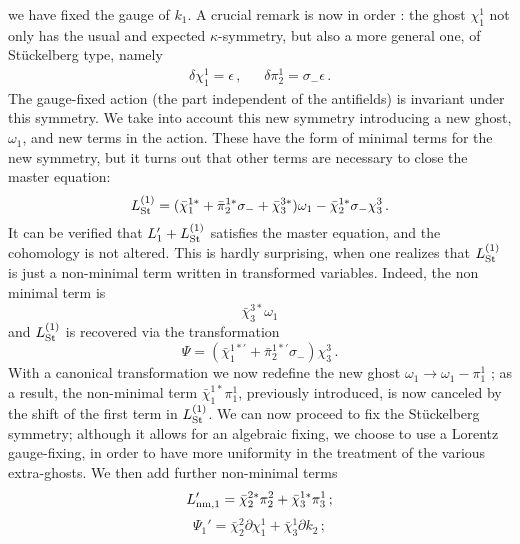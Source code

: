 \documentclass[a4paper,12pt]{article}
\begin{document}
we have fixed the gauge of $k_1$. 
A crucial remark is now in order \cite{kallosh}: the ghost
$\chi_1^1$ 
not only has the usual and expected $\kappa$-symmetry, but also a more
general one, of St\"uckelberg type, namely
\begin{eqnarray*}
  \delta \chi_1^1 =  \epsilon \, ,~~~~~~~
  \delta \pi_2^1 =  \sigma_- \epsilon \, . 
\end{eqnarray*}
The gauge-fixed action (the part independent of the antifields) is
invariant under this symmetry. We take into account this new symmetry
introducing a new ghost, $\omega_1$, and new terms in the
action. These have the form of minimal terms for the new symmetry, but 
it turns out that other terms are necessary to close the master
equation:
\begin{equation}
  L_{\rm St}^{(1)} = ({\bar\chi}_1^{1*}  + {\bar \pi}_2^{1*} \sigma_- 
  + {\bar\chi}_3^{3*}) \omega_1 - {\bar\chi}_2^{1*} \sigma_-
  \chi_3^3 \, .
\end{equation}
It can be verified that $L_1' + L_{\rm St}^{(1)}$ satisfies the master
equation, and the cohomology is not altered.
This is hardly surprising, when one realizes that $L_{\rm St}^{(1)}$ is
just a non-minimal term written in transformed variables. Indeed, the
non minimal term is
\begin{displaymath}
  {\bar\chi}_3^{3*} \omega_1
\end{displaymath}
and $L_{\rm St}^{(1)}$ is recovered via the transformation
\begin{displaymath}
  \Psi = ({\bar\chi}_1^{{1*}'} + {\bar\pi}_2^{{1*}'} \sigma_-) \chi_3^3 \, .
\end{displaymath}
With a canonical transformation we now redefine the new ghost
$\omega_1 \to \omega_1 - \pi_1^1$ ; as a result, the non-minimal term
${\bar\chi}_1^{1*} \pi_1^1$, previously introduced, is now canceled by the
shift of the first term in $ L_{\rm St}^{(1)}$. We can now proceed to fix 
the St\"uckelberg symmetry; although it allows for an algebraic
fixing, we choose to use a Lorentz gauge-fixing, in order to have more 
uniformity in the treatment of the various extra-ghosts.  We then add
further non-minimal terms
\begin{equation}
  L_{\rm nm,1}' = {\bar\chi}_2^{2*} \pi_2^2 + {\bar\chi}_3^{1*} \pi_3^1 \, 
  ;
\end{equation}
\begin{displaymath}
  \Psi_1' = \bar\chi_2^2 \partial \chi_1^1 + \bar\chi_3^1 \partial k_2 
  \, ;
\end{displaymath}
\end{document}
